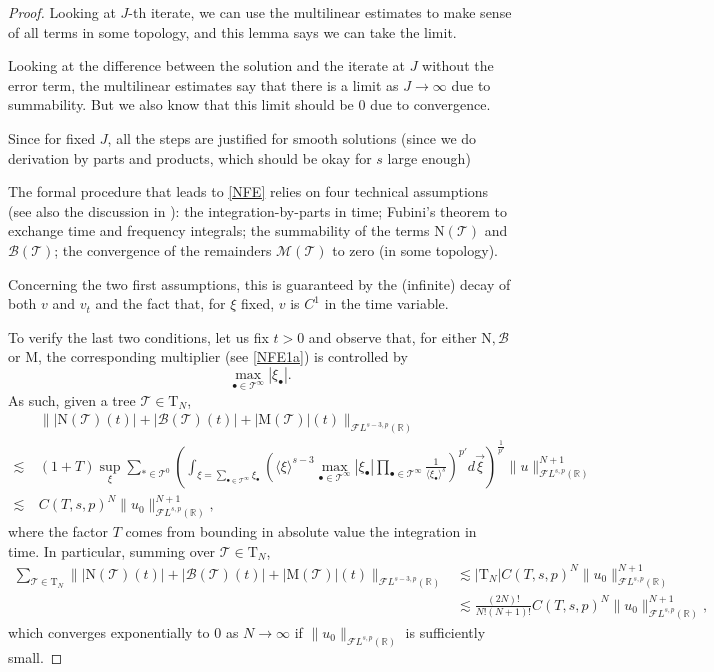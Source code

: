 \documentclass[%
11pt,  reqno]{amsart}
\newcommand{\jap}[1]{\langle #1 \rangle}
\newcommand{\5}{\textup{V}}
\newcommand{\noi}{\noindent}
\theoremstyle{remark}
\newcommand{\R}{\mathbb{R}}
\newcommand{\bul}{\bullet}
\newcommand{\TT}{\mathcal{T}}
\newcommand{\Tr}{\mathrm{T}}
\newcommand{\B}{\mathcal{B}}
\numberwithin{equation}{section}
\numberwithin{theorem}{section}
\newcommand{\MM}{\mathrm{M}}
\newcommand{\NN}{\mathrm{N}}
\newcommand{\andreia}[1]{\marginpar{\color{purple} $\Leftarrow\Leftarrow\Leftarrow$}{\smallskip \noi\color{purple}ANDREIA: #1}\smallskip}
\begin{document}
{\begin{proof}
{Looking at $J$-th iterate, we can use the multilinear estimates to make sense of all terms in some topology, and this lemma says we can take the limit. 

Looking at the difference between the solution and the iterate at $J$ without the error term, the multilinear estimates say that there is a limit as $J\to\infty$ due to summability. But we also know that this limit should be 0 due to convergence.

Since for fixed $J$, all the steps are justified for smooth solutions (since we do derivation by parts and products, which should be okay for $s$ large enough) 
}


\color{blue}


\andreia{CHECK }


	The formal procedure that leads to \eqref{NFE} relies on four technical assumptions (see also the discussion in \cite[PÁGINA]{KOY}): the integration-by-parts in time; Fubini's theorem to exchange time and frequency integrals; the summability of the terms $\NN(\TT)$ and $\B(\TT)$; the convergence of the remainders $\mathcal{M}(\TT)$ to zero (in some topology).
	
	Concerning the two first assumptions, this is guaranteed by the (infinite) decay of both $v$ and $v_t$ and the fact that, for $\xi$ fixed, $v$ is $C^1$ in the time variable.
	
	To verify the last two conditions, let us fix $t>0$ and observe that, for either $\NN, \B$ or $\MM$, the corresponding multiplier (see \eqref{NFE1a}) is controlled by 
	$$\max_{\bul\in \TT^\infty}|\xi_\bul|.
	$$ As such, given a tree $\TT\in \Tr_N$,
	\begin{align*}
	&\||\NN(\TT)(t)| + |\B(\TT)(t)| + |\MM(\TT)|(t)\|_{\mathcal{F}L^{s-3,p}(\R)}\\\lesssim\ & (1+T)\sup_\xi\sum_{\ast \in \TT^0} \left( \int_{\xi=\sum_{\bul\in\TT^\infty}\xi_\bul} \left({\jap{\xi}^{s-3}\max_{\bul\in \TT^\infty}|\xi_\bul|}\prod_{{\bul\in \TT^\infty}} \frac{1}{\jap{\xi_\bul}^{s}}\right)^{p'} d\vec{\xi} \right)^{\frac{1}{p'}}\|u\|_{\mathcal{F}L^{s,p}(\R)}^{N+1}\\\lesssim\ & C(T,s,p)^N\|u_0\|_{\mathcal{F}L^{s,p}(\R)}^{N+1},
	\end{align*}
	where the factor $T$ comes from bounding in absolute value the integration in time. In particular, summing over $\TT\in \Tr_N$,
\begin{align*}
		\sum_{\TT\in \Tr_N} \||\NN(\TT)(t)| + |\B(\TT)(t)| + |\MM(\TT)|(t)\|_{\mathcal{F}L^{s-3,p}(\R)} &\lesssim |\Tr_N|C(T,s,p)^N\|u_0\|_{\mathcal{F}L^{s,p}(\R)}^{N+1}\\&\lesssim \frac{(2N)!}{N!(N+1)!}C(T,s,p)^N\|u_0\|_{\mathcal{F}L^{s,p}(\R)}^{N+1},
\end{align*}
	which converges exponentially to 0 as $N\to \infty$ if $\|u_0\|_{\mathcal{F}L^{s,p}(\R)}$ is sufficiently small.
\end{proof}




}
\end{document}
